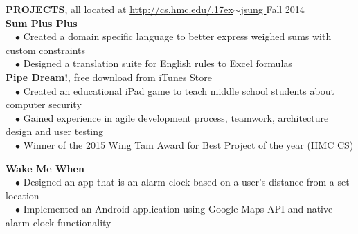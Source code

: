 \documentclass[11pt]{article}
\newcommand{\tildeText}{\raise.17ex\hbox{$\scriptstyle\sim$}}
\newcommand{\websitedisplaytext}{\small http://cs.hmc.edu/\tildeText jsung }
\newcommand{\website}{\href{http://cs.hmc.edu/~jsung}{\websitedisplaytext}}
\newcommand{\sectionNL}{\\[-2pt]}
\newcommand{\customtab}{$\hspace{10pt} \bullet \hspace{2pt}$}
\newcommand{\JudgeNudge}{\hspace{4pt}}
\newcommand{\rightAlign}{\hfill}
\begin{document}
\begin{flushleft}
{\textbf{PROJECTS}, all located at \website} \rightAlign Fall 2014 \sectionNL 
\textbf{Sum Plus Plus} \\
\customtab Created a domain specific language to better express weighed sums with custom constraints \\
\customtab Designed a translation suite for English rules to Excel formulas \\

\textbf{Pipe Dream!}, \href{https://itunes.apple.com/us/app/pipe-dream!/id947630499?mt=8}{free download} from iTunes Store \\
\customtab Created an educational iPad game to teach middle school students about computer security\\
\customtab Gained experience in agile development process, teamwork, architecture design and user testing \\
\customtab Winner of the 2015 Wing Tam Award for Best Project of the year (HMC CS)

\textbf{Wake Me When}\\
\customtab Designed an app that is an alarm clock based on a user's distance from a set location \\
\customtab Implemented an Android application using Google Maps API and native alarm clock functionality \\
 


\end{flushleft}
\end{document}
